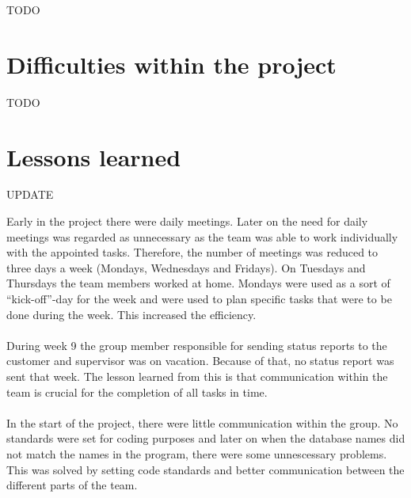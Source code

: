 TODO

\section{Difficulties within the project}

TODO

\section{Lessons learned}

UPDATE

Early in the project there were daily meetings. Later on the need for daily meetings was regarded as unnecessary as the team was able to work individually with the appointed tasks. Therefore, the number of meetings was reduced to three days a week (Mondays, Wednesdays and Fridays). On Tuesdays and Thursdays the team members worked at home. Mondays were used as a sort of “kick-off”-day for the week and were used to plan specific tasks that were to be done during the week. This increased the efficiency.\\
\\
During week 9 the group member responsible for sending status reports to the customer and supervisor was on vacation. Because of that, no status report was sent that week. The lesson learned from this is that communication within the team is crucial for the completion of all tasks in time.\\
\\
In the start of the project, there were little communication within the group. No standards were set
for coding purposes and later on when the database names did not match the names in the program, there were some unnescessary problems. This was solved by setting code standards and better communication between the different 
parts of the team. \\
